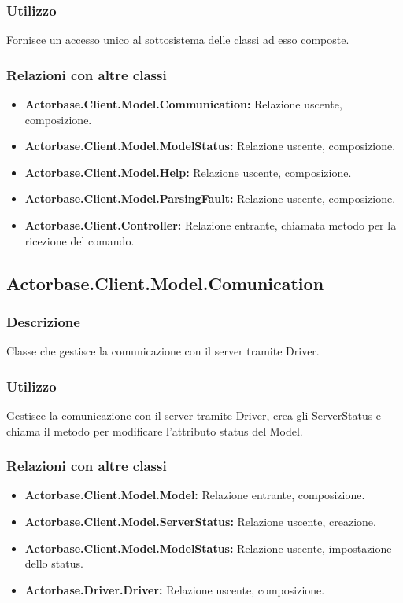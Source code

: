 \documentclass[a4paper]{article}
\begin{document}
			\subsubsection{Utilizzo}
				Fornisce un accesso unico al sottosistema delle classi ad esso composte.
			\subsubsection{Relazioni con altre classi}
				\begin{itemize}
					\item \textbf{Actorbase.Client.Model.Communication:} Relazione uscente, composizione.
					\item \textbf{Actorbase.Client.Model.ModelStatus:} Relazione uscente, composizione.
					\item \textbf{Actorbase.Client.Model.Help:} Relazione uscente, composizione.
					\item \textbf{Actorbase.Client.Model.ParsingFault:}	Relazione uscente, composizione.
					\item \textbf{Actorbase.Client.Controller:}	Relazione entrante, chiamata metodo per la ricezione del comando.	
				\end{itemize}
			
		\subsection{Actorbase.Client.Model.Comunication}
			\subsubsection{Descrizione}
				Classe che gestisce la comunicazione con il server tramite Driver.
			\subsubsection{Utilizzo}
				Gestisce la comunicazione con il server tramite Driver, crea gli ServerStatus e chiama il metodo per modificare l'attributo status del Model.
			\subsubsection{Relazioni con altre classi}
				\begin{itemize}
					\item \textbf{Actorbase.Client.Model.Model:} Relazione entrante, composizione.
					\item \textbf{Actorbase.Client.Model.ServerStatus:} Relazione uscente, creazione.
					\item \textbf{Actorbase.Client.Model.ModelStatus:} Relazione uscente, impostazione dello status.
					\item \textbf{Actorbase.Driver.Driver:} Relazione uscente, composizione.
				\end{itemize}
		
\end{document}
